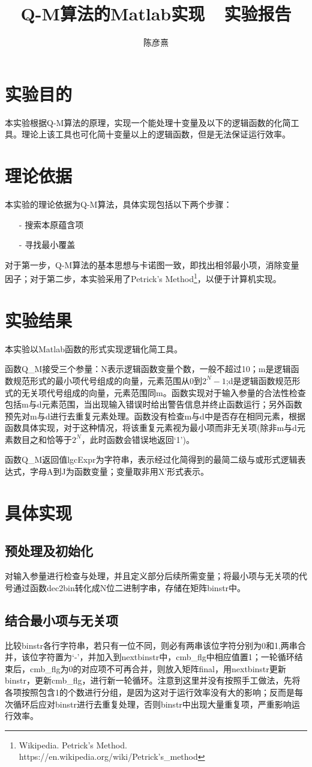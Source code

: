 \documentclass[12pt, a4paper, titlepage]{article}
\author{陈彦熹}
\title{Q-M算法的Matlab实现\ \ 实验报告}
\begin{document}
	\maketitle
	\section{实验目的}
	本实验根据Q-M算法的原理，实现一个能处理十变量及以下的逻辑函数的化简工具。理论上该工具也可化简十变量以上的逻辑函数，但是无法保证运行效率。
	\section{理论依据}
	本实验的理论依据为Q-M算法，具体实现包括以下两个步骤：
	\begin{itemize}
		\item[-]搜索本原蕴含项
		\item[-]寻找最小覆盖
	\end{itemize}
	对于第一步，Q-M算法的基本思想与卡诺图一致，即找出相邻最小项，消除变量因子；对于第二步，本实验采用了Petrick's Method\footnote{Wikipedia. Petrick's Method. https://en.wikipedia.org/wiki/Petrick's\_method}，以便于计算机实现。
	\section{实验结果}
	本实验以Matlab函数的形式实现逻辑化简工具。
	
	函数Q\_M接受三个参量：N表示逻辑函数变量个数，一般不超过10；m是逻辑函数规范形式的最小项代号组成的向量，元素范围从0到$2^N-1$;d是逻辑函数规范形式的无关项代号组成的向量，元素范围同m。函数实现对于输入参量的合法性检查包括m与d元素范围，当出现输入错误时给出警告信息并终止函数运行；另外函数预先对m与d进行去重复元素处理。函数没有检查m与d中是否存在相同元素，根据函数具体实现，对于这种情况，将该重复元素视为最小项而非无关项(除非m与d元素数目之和恰等于$2^N$，此时函数会错误地返回`1')。
	
	函数Q\_M返回值lgcExpr为字符串，表示经过化简得到的最简二级与或形式逻辑表达式，字母A到J为函数变量；变量取非用X'形式表示。
	\section{具体实现}
		\subsection{预处理及初始化}
		对输入参量进行检查与处理，并且定义部分后续所需变量；将最小项与无关项的代号通过函数dec2bin转化成N位二进制字串，存储在矩阵binstr中。
		\subsection{结合最小项与无关项}
		比较binstr各行字符串，若只有一位不同，则必有两串该位字符分别为0和1,两串合并，该位字符置为`-'，并加入到nextbinstr中，cmb\_flg中相应值置1；一轮循环结束后，cmb\_flg为0的对应项不可再合并，则放入矩阵final，用nextbinstr更新binstr，更新cmb\_flg，进行新一轮循环。注意到这里并没有按照手工做法，先将各项按照包含1的个数进行分组，是因为这对于运行效率没有大的影响；反而是每次循环后应对binstr进行去重复处理，否则binstr中出现大量重复项，严重影响运行效率。
\end{document}
